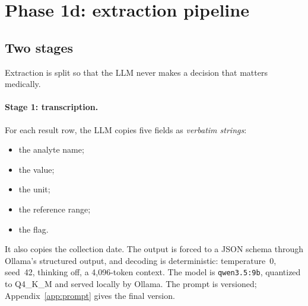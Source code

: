 \documentclass[11pt,a4paper]{article}
\begin{document}
\section{Phase 1d: extraction pipeline}

\subsection{Two stages}
Extraction is split so that the LLM never makes a decision that matters medically.

\paragraph{Stage 1: transcription.} For each result row, the LLM copies five fields as \emph{verbatim strings}:
\begin{itemize}[nosep]
  \item the analyte name;
  \item the value;
  \item the unit;
  \item the reference range;
  \item the flag.
\end{itemize}
It also copies the collection date. The output is forced to a JSON schema through Ollama's structured output, and decoding is deterministic: temperature~0, seed~42, thinking off, a 4,096-token context. The model is \texttt{qwen3.5:9b}, quantized to Q4\_K\_M and served locally by Ollama. The prompt is versioned; Appendix~\ref{app:prompt} gives the final version.
\end{document}
